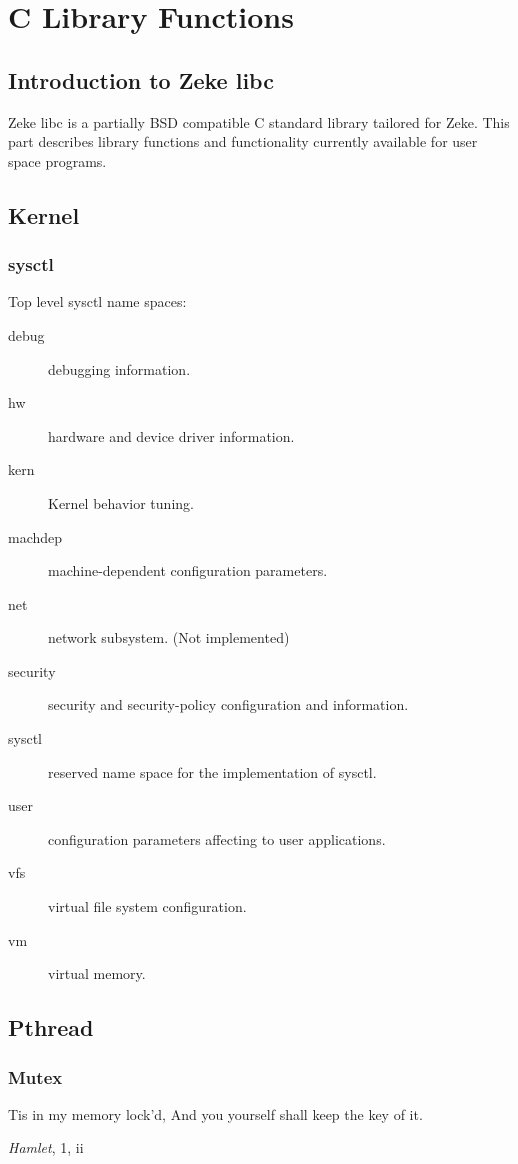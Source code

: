\part{C Library Functions}

\chapter{Introduction to Zeke libc}

Zeke libc is a partially BSD compatible C standard library tailored for Zeke.
This part describes library functions and functionality currently available for
user space programs.

\chapter{Kernel}
\section{sysctl}

Top level sysctl name spaces:

\begin{description}
\item[debug]    debugging information.
\item[hw]       hardware and device driver information.
\item[kern]     Kernel behavior tuning.
\item[machdep]  machine-dependent configuration parameters.
\item[net]      network subsystem. (Not implemented)
\item[security] security and security-policy configuration and information.
\item[sysctl]   reserved name space for the implementation of sysctl.
\item[user]     configuration parameters affecting to user applications.
\item[vfs]      virtual file system configuration.
\item[vm]       virtual memory.
\end{description}

\chapter{Pthread}
\section{Mutex}

\epigraph{Tis in my memory lock'd,\newline
          And you yourself shall keep the key of it.}{\textit{Hamlet}, 1, ii}
